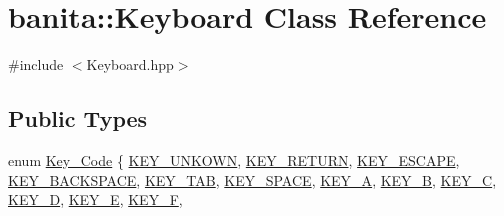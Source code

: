 \hypertarget{classbanita_1_1_keyboard}{}\section{banita\+::Keyboard Class Reference}
\label{classbanita_1_1_keyboard}


{\ttfamily \#include $<$Keyboard.\+hpp$>$}

\subsection*{Public Types}
\begin{DoxyCompactItemize}
\item 
enum \mbox{\hyperlink{classbanita_1_1_keyboard_a0dee214e6cb4f246866603b85568b9ab}{Key\+\_\+\+Code}} \{ \newline
\mbox{\hyperlink{classbanita_1_1_keyboard_a0dee214e6cb4f246866603b85568b9ababa5e2bdb6568d3ec794065d9150163e4}{K\+E\+Y\+\_\+\+U\+N\+K\+O\+WN}}, 
\mbox{\hyperlink{classbanita_1_1_keyboard_a0dee214e6cb4f246866603b85568b9aba47f754048d61751daa282d52bb1ab9a3}{K\+E\+Y\+\_\+\+R\+E\+T\+U\+RN}}, 
\mbox{\hyperlink{classbanita_1_1_keyboard_a0dee214e6cb4f246866603b85568b9aba3fa75682be0b44280e8740f56ff842ad}{K\+E\+Y\+\_\+\+E\+S\+C\+A\+PE}}, 
\mbox{\hyperlink{classbanita_1_1_keyboard_a0dee214e6cb4f246866603b85568b9aba7858fa5c081a0428a0f0447e152efc0b}{K\+E\+Y\+\_\+\+B\+A\+C\+K\+S\+P\+A\+CE}}, 
\newline
\mbox{\hyperlink{classbanita_1_1_keyboard_a0dee214e6cb4f246866603b85568b9aba3f9f3f591a1420d69f165ef857b15e16}{K\+E\+Y\+\_\+\+T\+AB}}, 
\mbox{\hyperlink{classbanita_1_1_keyboard_a0dee214e6cb4f246866603b85568b9aba7a267bc081508b64d4b0ba299a8d1160}{K\+E\+Y\+\_\+\+S\+P\+A\+CE}}, 
\mbox{\hyperlink{classbanita_1_1_keyboard_a0dee214e6cb4f246866603b85568b9abab100faaffa9b56018465e34425157933}{K\+E\+Y\+\_\+A}}, 
\mbox{\hyperlink{classbanita_1_1_keyboard_a0dee214e6cb4f246866603b85568b9abaf7b80bb52861bac4d3997fd7736dfb16}{K\+E\+Y\+\_\+B}}, 
\newline
\mbox{\hyperlink{classbanita_1_1_keyboard_a0dee214e6cb4f246866603b85568b9aba98120d7d01daf4036fed8d2c702239d1}{K\+E\+Y\+\_\+C}}, 
\mbox{\hyperlink{classbanita_1_1_keyboard_a0dee214e6cb4f246866603b85568b9aba1de33f2731a8a9b58c22d77f826f7f2b}{K\+E\+Y\+\_\+D}}, 
\mbox{\hyperlink{classbanita_1_1_keyboard_a0dee214e6cb4f246866603b85568b9aba80a11c04883aa462dced08c31ba24d56}{K\+E\+Y\+\_\+E}}, 
\mbox{\hyperlink{classbanita_1_1_keyboard_a0dee214e6cb4f246866603b85568b9aba91a202256cb1d29c6179423d0cb0245c}{K\+E\+Y\+\_\+F}}, 

\end{DoxyCompactItemize}
